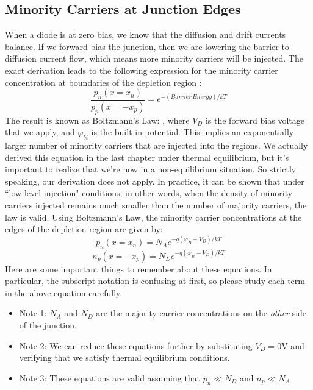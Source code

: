 \subsection{Minority Carriers at Junction Edges}
When a diode is at zero bias, we know that the diffusion and drift currents balance.  If we forward bias the junction, then we are lowering the barrier to diffusion current flow, which means more minority carriers will be injected.  The exact derivation leads to the following expression for the minority carrier concentration at boundaries of the depletion region :
    \begin{equation} 
        \frac{{{p_n}(x = {x_n})}}{{{p_p}(x =  - {x_p})}} =  {e^{ - (Barrier\,Energy)/kT}}
    \end{equation}
The result is known as Boltzmann's Law:
    , where $V_D$ is the forward bias voltage that we apply, and $\varphi_{bi}$ is the built-in potential.  This implies an exponentially larger number of minority carriers that are injected into the regions.
We actually derived this equation in the last chapter under thermal equilibrium, but it's important to realize that we're now in a non-equilibrium situation.  So strictly speaking, our derivation does not apply.  In practice, it can be shown that under ``low level injection" conditions, in other words, when the density of minority carriers injected remains much smaller than the number of majority carriers, the law is valid.
Using Boltzmann's Law, the minority carrier concentrations at the edges of the depletion region are given by:
    \begin{equation} 
        {p_n}(x = {x_n}) = {N_A}{e^{ - q({\varphi _B} - {V_D})/kT}}
    \end{equation}
    \begin{equation} 
        {n_p}(x =  - {x_p}) = {N_D}{e^{ - q({\varphi _B} - {V_D})/kT}}
    \end{equation}
Here are some important things to remember about these equations.  In particular, the subscript notation is confusing at first, so please study each term in the above equation carefully.
    \begin{itemize}
        \item Note 1: $N_A$ and $N_D$ are the majority carrier concentrations on the \textit{other} side of the junction.
        \item  Note 2: We can reduce these equations further by substituting $V_D = 0$V and verifying that we satisfy thermal equilibrium conditions.
        \item  Note 3:  These equations are valid assuming that $p_n \ll N_D$ and $n_p \ll N_A$
    \end{itemize}

